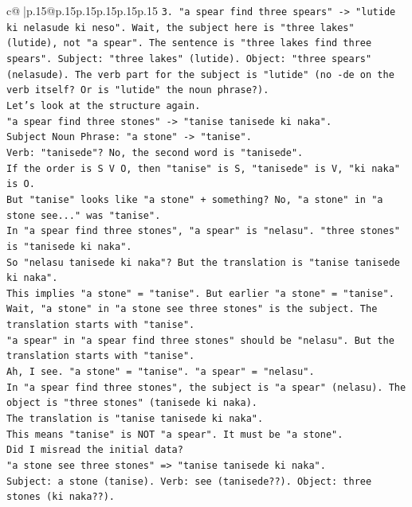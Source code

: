 \documentclass{article}
\begin{document}
{\begin{supertabular}{c@{$\;$}|p{.15\linewidth}@{}p{.15\linewidth}p{.15\linewidth}p{.15\linewidth}p{.15\linewidth}p{.15\linewidth}}
{{{\texttt{3. "a spear find three spears" {-}> "lutide ki nelasude ki neso". Wait, the subject here is "three lakes" (lutide), not "a spear". The sentence is "three lakes find three spears". Subject: "three lakes" (lutide). Object: "three spears" (nelasude). The verb part for the subject is "lutide" (no {-}de on the verb itself? Or is "lutide" the noun phrase?).} \\
\texttt{Let's look at the structure again.} \\
\texttt{"a spear find three stones" {-}> "tanise tanisede ki naka".} \\
\texttt{Subject Noun Phrase: "a stone" {-}> "tanise".} \\
\texttt{Verb: "tanisede"? No, the second word is "tanisede".} \\
\texttt{If the order is S V O, then "tanise" is S, "tanisede" is V, "ki naka" is O.} \\
\texttt{But "tanise" looks like "a stone" + something? No, "a stone" in "a stone see..." was "tanise".} \\
\texttt{In "a spear find three stones", "a spear" is "nelasu". "three stones" is "tanisede ki naka".} \\
\texttt{So "nelasu tanisede ki naka"? But the translation is "tanise tanisede ki naka".} \\
\texttt{This implies "a stone" = "tanise". But earlier "a stone" = "tanise".} \\
\texttt{Wait, "a stone" in "a stone see three stones" is the subject. The translation starts with "tanise".} \\
\texttt{"a spear" in "a spear find three stones" should be "nelasu". But the translation starts with "tanise".} \\
\texttt{Ah, I see. "a stone" = "tanise". "a spear" = "nelasu".} \\
\texttt{In "a spear find three stones", the subject is "a spear" (nelasu). The object is "three stones" (tanisede ki naka).} \\
\texttt{The translation is "tanise tanisede ki naka".} \\
\texttt{This means "tanise" is NOT "a spear". It must be "a stone".} \\
\texttt{Did I misread the initial data?} \\
\texttt{"a stone see three stones" => "tanise tanisede ki naka".} \\
\texttt{Subject: a stone (tanise). Verb: see (tanisede??). Object: three stones (ki naka??).} \\
}}}
\end{supertabular}}
\end{document}
